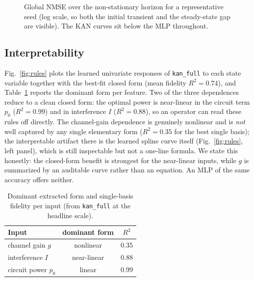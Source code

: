 \documentclass[journal]{IEEEtran}
\newcommand{\ruleGform}{nonlinear}\newcommand{\ruleGrtwo}{0.35}
\newcommand{\ruleIform}{near-linear}\newcommand{\ruleIrtwo}{0.88}
\newcommand{\ruleProform}{linear}\newcommand{\rulePrortwo}{0.99}
\newcommand{\ruleFid}{0.74}
\begin{document}
\begin{figure}[t]
\centering
{}
\caption{Global NMSE over the non-stationary horizon for a representative seed
(log scale, so both the initial transient and the steady-state gap are visible).
The KAN curves sit below the MLP throughout.}
\label{fig:ts}
\end{figure}

\subsection{Interpretability}
Fig.~\ref{fig:rules} plots the learned univariate responses of \texttt{kan\_full}
to each state variable together with the best-fit closed form (mean fidelity
$R^2=\ruleFid$), and Table~\ref{tab:rules} reports the dominant form per feature.
Two of the three dependences reduce to a clean closed form: the optimal power is
near-linear in the circuit term $p_0$ ($R^2=\rulePrortwo$) and in interference $I$
($R^2=\ruleIrtwo$), so an operator can read these rules off directly. The channel-gain
dependence is genuinely nonlinear and is \emph{not} well captured by any single
elementary form ($R^2=\ruleGrtwo$ for the best single basis); the interpretable
artifact there is the learned spline curve itself (Fig.~\ref{fig:rules}, left
panel), which is still inspectable but not a one-line formula. We state this
honestly: the closed-form benefit is strongest for the near-linear inputs, while
$g$ is summarized by an auditable curve rather than an equation. An MLP of the same
accuracy offers neither.

\begin{table}[t]
\caption{Dominant extracted form and single-basis fidelity per input
(from \texttt{kan\_full} at the headline scale).}
\label{tab:rules}
\centering
\footnotesize
\begin{tabular}{lcc}
\toprule
Input & dominant form & $R^2$ \\
\midrule
channel gain $g$ & \ruleGform & \ruleGrtwo \\
interference $I$ & \ruleIform & \ruleIrtwo \\
circuit power $p_0$ & \ruleProform & \rulePrortwo \\
\bottomrule
\end{tabular}
\end{table}
\end{document}
